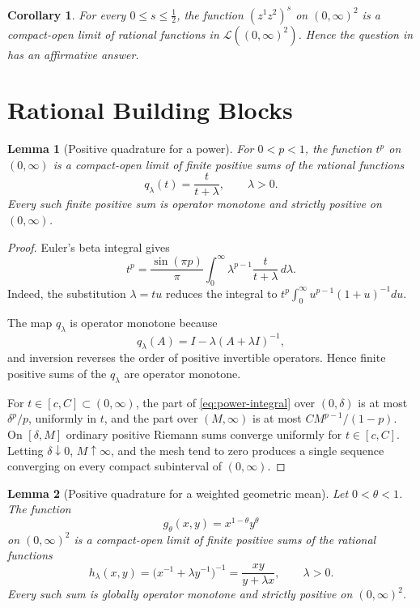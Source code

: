 \documentclass[11pt]{article}
\newtheorem{lemma}{Lemma}
\newtheorem{corollary}{Corollary}
\newcommand{\Loe}{\mathcal L}
\newcommand{\Pos}{(0,\infty)}
\begin{document}
\begin{corollary}\label{cor:source}
For every $0\leq s\leq\tfrac12$, the function
$(z^1z^2)^s$ on $\Pos^2$ is a compact-open limit of rational functions in
$\Loe(\Pos^2)$.  Hence the question in \cite{AMY} has an affirmative answer.
\end{corollary}

\section*{Rational Building Blocks}

\begin{lemma}[Positive quadrature for a power]\label{lem:power}
For $0<p<1$, the function $t^p$ on $\Pos$ is a compact-open limit of finite
positive sums of the rational functions
\[
                         q_\lambda(t)=\frac{t}{t+\lambda},
                         \qquad \lambda>0.
\]
Every such finite positive sum is operator monotone and strictly positive on
$\Pos$.
\end{lemma}

\begin{proof}
Euler's beta integral gives
\begin{equation}\label{eq:power-integral}
 t^p=\frac{\sin(\pi p)}{\pi}
       \int_0^\infty \lambda^{p-1}\frac{t}{t+\lambda}\,d\lambda.
\end{equation}
Indeed, the substitution $\lambda=tu$ reduces the integral to
$t^p\int_0^\infty u^{p-1}(1+u)^{-1}du$.

The map $q_\lambda$ is operator monotone because
\[
 q_\lambda(A)=I-\lambda(A+\lambda I)^{-1},
\]
and inversion reverses the order of positive invertible operators.  Hence
finite positive sums of the $q_\lambda$ are operator monotone.

For $t\in[c,C]\subset\Pos$, the part of \eqref{eq:power-integral} over
$(0,\delta)$ is at most $\delta^p/p$, uniformly in $t$, and the part over
$(M,\infty)$ is at most $C M^{p-1}/(1-p)$.  On $[\delta,M]$ ordinary
positive Riemann sums converge uniformly for $t\in[c,C]$.  Letting
$\delta\downarrow0$, $M\uparrow\infty$, and the mesh tend to zero produces a
single sequence converging on every compact subinterval of $\Pos$.
\end{proof}

\begin{lemma}[Positive quadrature for a weighted geometric mean]
\label{lem:geometric}
Let $0<\theta<1$.  The function
\[
                         g_\theta(x,y)=x^{1-\theta}y^\theta
\]
on $\Pos^2$ is a compact-open limit of finite positive sums of the rational
functions
\[
 h_\lambda(x,y)
   =\bigl(x^{-1}+\lambda y^{-1}\bigr)^{-1}
   =\frac{xy}{y+\lambda x},
 \qquad \lambda>0.
\]
Every such sum is globally operator monotone and strictly positive on
$\Pos^2$.
\end{lemma}
\end{document}
